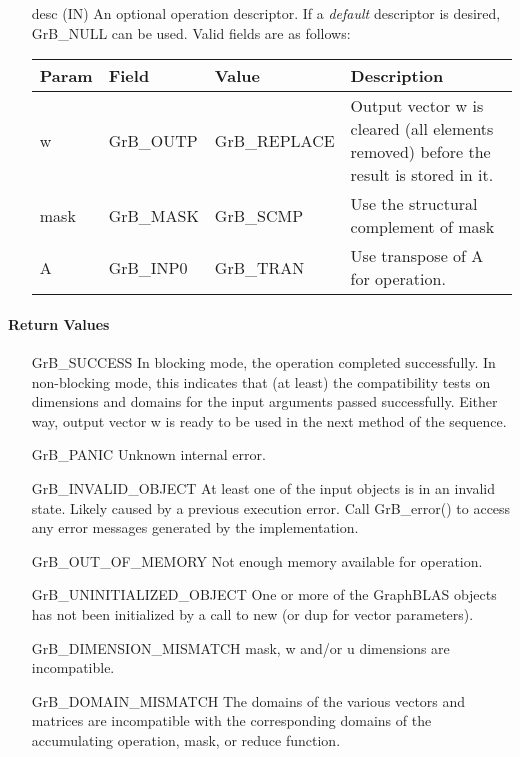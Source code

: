 \begin{itemize}[leftmargin=1.1in]
    \item[{\sf desc}]  ({\sf IN}) An optional operation descriptor.  If a \emph{default}
    descriptor is desired, {\sf GrB\_NULL} can be used.  Valid fields are
    as follows: \\
    
    \begin{tabular}{lllp{2.5in}}
        Param & Field  & Value & Description \\
        \hline
        {\sf w}    & {\sf GrB\_OUTP} & {\sf GrB\_REPLACE} & Output vector {\sf w}
        is cleared (all elements removed) before the result is stored in it. \\
        
	    {\sf mask} & {\sf GrB\_MASK} & {\sf GrB\_SCMP}   & Use the structural complement of {\sf mask}\\
        {\sf A}    & {\sf GrB\_INP0} & {\sf GrB\_TRAN}   & Use transpose of {\sf A} for operation. 
    \end{tabular}
\end{itemize}

\paragraph{Return Values}

\begin{itemize}[leftmargin=2.1in]
    \item[{\sf GrB\_SUCCESS}]         In blocking mode, the operation completed
	    successfully. In non-blocking mode, this indicates that (at least) the compatibility 
    tests on dimensions and domains for the input arguments passed successfully. 
    Either way, output vector {\sf w} is ready to be used in the next method of 
    the sequence.

    \item[{\sf GrB\_PANIC}]            Unknown internal error.
    
    \item[{\sf GrB\_INVALID\_OBJECT}] At least one of the input objects is
	    in an invalid state. Likely caused by a previous execution error.
    Call {\sf GrB\_error()} to access 
    any error messages generated by the implementation.

    \item[{\sf GrB\_OUT\_OF\_MEMORY}]  Not enough memory available for operation.
    
    \item[{\sf GrB\_UNINITIALIZED\_OBJECT}] One or more of the GraphBLAS objects 
    has not been initialized by a call to {\sf new} (or {\sf dup} for vector
    parameters).
    
    \item[{\sf GrB\_DIMENSION\_MISMATCH}]  {\sf mask}, {\sf w} and/or {\sf u} dimensions are
    incompatible. 
    
    \item[{\sf GrB\_DOMAIN\_MISMATCH}]    The domains of the various vectors and matrices are
	incompatible with the corresponding domains of the accumulating operation, 
    mask, or reduce function.
\end{itemize}

